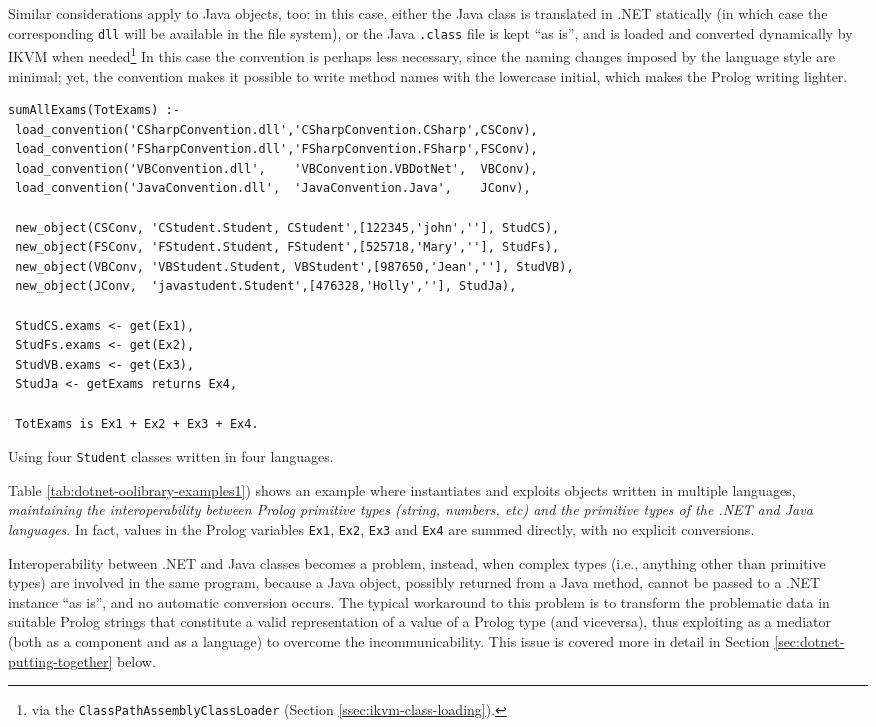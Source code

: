 Similar considerations apply to Java objects, too: in this case, either the Java class is translated in .NET statically (in which case the corresponding \texttt{dll} will be available in the file system), or the Java \texttt{.class} file is kept ``as is'', and is loaded and converted dynamically by IKVM when needed\footnote{via the \texttt{ClassPathAssemblyClassLoader} (Section \ref{ssec:ikvm-class-loading}).}
In this case the convention is perhaps less necessary, since the naming changes imposed by the language style are minimal; yet, the convention makes it possible to write method names with the lowercase initial, which makes the Prolog writing lighter.


\begin{table}
{\footnotesize
\begin{verbatim}
sumAllExams(TotExams) :-
 load_convention('CSharpConvention.dll','CSharpConvention.CSharp',CSConv),
 load_convention('FSharpConvention.dll','FSharpConvention.FSharp',FSConv),
 load_convention('VBConvention.dll',    'VBConvention.VBDotNet',  VBConv),
 load_convention('JavaConvention.dll',  'JavaConvention.Java',    JConv),

 new_object(CSConv, 'CStudent.Student, CStudent',[122345,'john',''], StudCS),
 new_object(FSConv, 'FStudent.Student, FStudent',[525718,'Mary',''], StudFs),
 new_object(VBConv, 'VBStudent.Student, VBStudent',[987650,'Jean',''], StudVB),
 new_object(JConv,  'javastudent.Student',[476328,'Holly',''], StudJa),

 StudCS.exams <- get(Ex1),
 StudFs.exams <- get(Ex2),
 StudVB.exams <- get(Ex3),
 StudJa <- getExams returns Ex4,

 TotExams is Ex1 + Ex2 + Ex3 + Ex4.
\end{verbatim}
}
  \caption{Using four \texttt{Student} classes written in four languages.}
  \label{tab:dotnet-oolibrary-examples2}
\end{table}

Table \ref{tab:dotnet-oolibrary-examples1}) shows an example where \tuprolog{} instantiates and exploits objects written in multiple languages, \textit{maintaining the interoperability between Prolog primitive types (string, numbers, etc) and the primitive types of the .NET and Java languages}.
In fact, values in the Prolog variables \texttt{Ex1}, \texttt{Ex2}, \texttt{Ex3} and \texttt{Ex4} are summed directly, with no explicit conversions.

Interoperability between .NET and Java classes becomes a problem, instead, when complex types (i.e., anything other than primitive types) are involved in the same \tuprolog{} program, because a Java object, possibly returned from a Java method, cannot be passed to a .NET instance ``as is'', and no automatic conversion occurs.
%
The typical workaround to this problem is to transform the problematic data in suitable Prolog strings that constitute a valid \tuprolog{} representation of a value of a Prolog type (and viceversa), thus exploiting \tuprolog{} as a mediator (both as a component and as a language) to overcome the incommunicability.
%
This issue is covered more in detail in Section \ref{sec:dotnet-putting-together} below.


